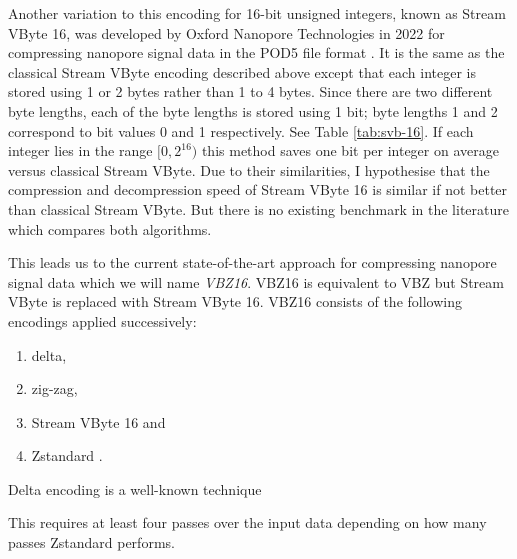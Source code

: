 Another variation to this encoding for 16-bit unsigned integers, known as Stream VByte 16, was developed by Oxford Nanopore Technologies in 2022 for compressing nanopore signal data in the POD5 file format \cite{pod5}. It is the same as the classical Stream VByte encoding described above except that each integer is stored using 1 or 2 bytes rather than 1 to 4 bytes. Since there are two different byte lengths, each of the byte lengths is stored using 1 bit; byte lengths 1 and 2 correspond to bit values 0 and 1 respectively. See Table \ref{tab:svb-16}. If each integer lies in the range $[0, 2^{16})$ this method saves one bit per integer on average versus classical Stream VByte. Due to their similarities, I hypothesise that the compression and decompression speed of Stream VByte 16 is similar if not better than classical Stream VByte. But there is no existing benchmark in the literature which compares both algorithms.



This leads us to the current state-of-the-art approach for compressing nanopore signal data which we will name \textit{VBZ16}. VBZ16 is equivalent to VBZ \cite{vbz} but Stream VByte is replaced with Stream VByte 16. VBZ16 consists of the following encodings applied successively:

\begin{enumerate}
\item delta,
\item zig-zag,
\item Stream VByte 16 and
\item Zstandard \cite{zstd}.
\end{enumerate}

Delta encoding is a well-known technique

This requires at least four passes over the input data depending on how many passes Zstandard performs.
